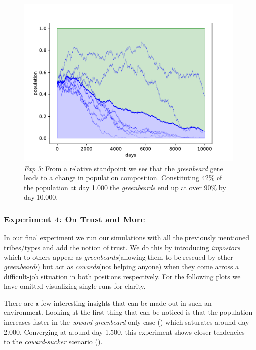 \documentclass[sigconf]{acmart}
\newcommand{\cowards}{\textit{cowards}\xspace}
\newcommand{\coward}{\textit{coward}\xspace}
\newcommand{\sucker}{\textit{sucker}\xspace}
\newcommand{\impostors}{\textit{impostors}\xspace}
\newcommand{\greenbeards}{\textit{greenbeards}\xspace}
\newcommand{\greenbeard}{\textit{greenbeard}\xspace}
\begin{document}
    \begin{figure}
        \includegraphics[width=\columnwidth]{figures/exp3_greenbeard_rel}
        \caption{\textit{Exp 3:} From a relative standpoint we see that the \greenbeard gene leads to a change in population composition.
        Constituting 42\% of the population at day 1.000 the \greenbeards end up at over 90\% by day 10.000.}
        \label{fig:exp3_greenbeard_rel}
    \end{figure}

    \subsubsection*{Experiment 4: On Trust and More}
    In our final experiment we run our simulations with all the previously mentioned tribes/types and add the notion of trust.
    We do this by introducing \impostors which to others appear as \greenbeards (allowing them to be rescued by other \greenbeards) but act as \cowards (not helping anyone) when they come across a difficult-job situation in both positions respectively.
    For the following plots we have omitted visualizing single runs for clarity.

    There are a few interesting insights that can be made out in such an environment.
    Looking at  the first thing that can be noticed is that the population increases faster in the \coward-\greenbeard only case () which saturates around day 2.000.
    Converging at around day 1.500, this experiment shows closer tendencies to the \coward-\sucker scenario ().
\end{document}
